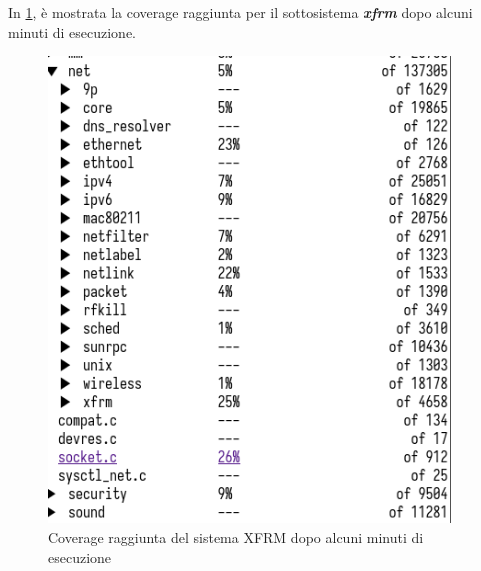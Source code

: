 \documentclass{article}
\begin{document}
In \cref{fig:coverage}, 
è mostrata la coverage raggiunta per il sottosistema \textbf{\textit{xfrm}} dopo alcuni minuti di 
esecuzione.

\begin{figure}
  \begin{center}
    \includegraphics[width=0.95\textwidth]{figures/xfrm-coverage.png}
  \end{center}
  \caption{Coverage raggiunta del sistema XFRM dopo alcuni minuti di esecuzione}\label{fig:coverage}
\end{figure}


\clearpage


\end{document}
